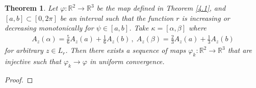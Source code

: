 \documentclass{amsart}
\theoremstyle{plain}
\newtheorem{theorem}{Theorem}[section]
\theoremstyle{definition}
\theoremstyle{remark}
\begin{document}
\begin{theorem}\label{4.3}%
Let $\varphi:{\mathbb R}^2\to{\mathbb R}^3$ be the map defined in Theorem \ref{4.1}, and $[a,b]\subset[0,2\pi]$ be an interval such that the function $r$ is increasing or decreasing monotonically for $\psi\in[a,b]$.
Take $\kappa=[\alpha,\beta]$ where
\begin{align*}
A_z(\alpha)=\frac56A_z(a)+\frac16A_z(b)\,,\;A_z(\beta)=\frac23A_z(a)+\frac13A_z(b)
\end{align*}
for arbitrary $z\in L_r$.
Then there exists a sequence of maps $\varphi_k:{\mathbb R}^2\to{\mathbb R}^3$ that are injective such that $\varphi_k\to\varphi$ in uniform convergence.
\end{theorem}

\begin{proof}
\iffalse
구간 $\kappa$에서 정의된 signed transition $\sigma$가 simple이 아니라고 가정하면 어떤 두 실수 $\psi_1<\psi_2\in[0,2\pi]$가 존재해 식 (\ref{gen})에 의해 $\varphi(\gamma(\psi_1))=\varphi(\gamma(\psi_2))$이므로 다음이 성립한다.
\begin{align*}
r(\psi_1)=r(\psi_2),
\end{align*}
\begin{align}\label{psieq}
\int_0^{\psi_1} \sigma(z,\theta)d\theta=\int_0^{\psi_2} \sigma(z,\theta)d\theta
\iff \int_{\psi_1}^{\psi_2} \sigma(z,\theta)d\theta=0.
\end{align}

$\psi_2<\alpha$라 가정하면 $[\psi_1,\psi_2]\cap[\alpha,\beta]=\varnothing$이므로
\begin{align*}
\int_{\psi_1}^{\psi_2} \sigma(z,\theta)d\theta=\int_{\psi_1}^{\psi_2} \tau(z,\theta)d\theta>0
\end{align*}
식 (\ref{psieq})에 모순되어 $\psi_2\ge\alpha$를 얻는다.

$\psi_1<a$라 가정하고 다음과 같이 식을 전개하자.
\begin{align*}
\int_{\psi_1}^{\psi_2} \sigma(z,\theta)d\theta=\left(a^*-\psi_1^*\right)+\left(\alpha^*-a^*\right)+\int_{\alpha}^{\psi_2} \sigma(z,\theta)d\theta.
\end{align*}
다음 부등식에 의하여
\begin{align*}
\int_{\alpha}^{\psi_2} \sigma(z,\theta)d\theta
\ge\int_{\alpha}^{\beta} \sigma(z,\theta)d\theta
=-\int_{\alpha}^{\beta} \tau(z,\theta)d\theta=-\beta^*+\alpha^*
\end{align*}
다음과 같은 식 (\ref{psieq})에 대한 모순을 얻는다.
\begin{align*}
\int_{\psi_1}^{\psi_2} \sigma(z,\theta)d\theta\ge\left(a^*-\psi_1^*\right)+\left(\alpha^*-a^*\right)-\left(\beta^*-\alpha^*\right)=a^*-\psi_1^*>0.
\end{align*}
따라서 $\psi_1\ge a$이고 비슷하게 $\psi_2\le b$를 증명할 수 있으므로 $[\psi_1,\psi_2]\subset[a,b]$이고 함수 $r(\theta)$는 구간 $[a,b]$에서 증가 또는 감소함수이므로 $r(\psi_1)=r(\psi_2)$가 성립하지 않는다.
구간 $\kappa$에서 정의된 $\sigma$가 simple이 아니라는 가정은 조건에 위배된다.
\fi
\end{proof}
\end{document}
